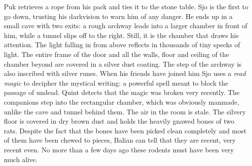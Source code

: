 Puk retrieves a rope from his pack and ties it to the stone table. Sjo is the first to go down, trusting his darkvision to warn him of any danger. He ends up in a small cave with two exits: a rough archway leads into a larger chamber in front of him, while a tunnel slips off to the right. Still, it is the chamber that draws his attention. The light falling in from above reflects in thousands of tiny specks of light. The entire frame of the door and all the walls, floor and ceiling of the chamber beyond are covered in a silver dust coating. The step of the archway is also inscribed with silver runes. When his friends have joined him Sjo uses a {\itshape read magic} to decipher the mystical writing: a powerful spell meant to block the passage of undead. Quint detects that the magic was broken very recently. The companions step into the rectangular chamber, which was obviously manmade, unlike the cave and tunnel behind them. The air in the room is stale. The silvery floor is covered in dry brown dust and holds the heavily gnawed bones of two rats. Despite the fact that the bones have been picked clean completely and most of them have been chewed to pieces, Balian can tell that they are recent, very recent even. No more than a few days ago these rodents must have been very much alive.\\

